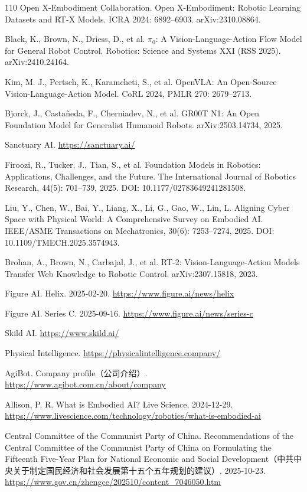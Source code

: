 \documentclass[10pt]{article}
\begin{document}
\begin{thebibliography}{110}
Open X-Embodiment Collaboration. Open X-Embodiment: Robotic Learning Datasets and RT-X Models. ICRA 2024: 6892–6903. arXiv:2310.08864.

Black, K., Brown, N., Driess, D., et al. $\pi_0$: A Vision-Language-Action Flow Model for General Robot Control. Robotics: Science and Systems XXI (RSS 2025). arXiv:2410.24164.

Kim, M. J., Pertsch, K., Karamcheti, S., et al. OpenVLA: An Open-Source Vision-Language-Action Model. CoRL 2024, PMLR 270: 2679–2713.

Bjorck, J., Castañeda, F., Cherniadev, N., et al. GR00T N1: An Open Foundation Model for Generalist Humanoid Robots. arXiv:2503.14734, 2025.

Sanctuary AI. \url{https://sanctuary.ai/}

Firoozi, R., Tucker, J., Tian, S., et al. Foundation Models in Robotics: Applications, Challenges, and the Future. The International Journal of Robotics Research, 44(5): 701–739, 2025. DOI: 10.1177/02783649241281508.

Liu, Y., Chen, W., Bai, Y., Liang, X., Li, G., Gao, W., Lin, L. Aligning Cyber Space with Physical World: A Comprehensive Survey on Embodied AI. IEEE/ASME Transactions on Mechatronics, 30(6): 7253–7274, 2025. DOI: 10.1109/TMECH.2025.3574943.

Brohan, A., Brown, N., Carbajal, J., et al. RT-2: Vision-Language-Action Models Transfer Web Knowledge to Robotic Control. arXiv:2307.15818, 2023.

Figure AI. Helix. 2025-02-20. \url{https://www.figure.ai/news/helix}

Figure AI. Series C. 2025-09-16. \url{https://www.figure.ai/news/series-c}

Skild AI. \url{https://www.skild.ai/}

Physical Intelligence. \url{https://physicalintelligence.company/}

AgiBot. Company profile（公司介绍）. \url{https://www.agibot.com.cn/about/company}

Allison, P. R. What is Embodied AI? Live Science, 2024-12-29. \url{https://www.livescience.com/technology/robotics/what-is-embodied-ai}

Central Committee of the Communist Party of China. Recommendations of the Central Committee of the Communist Party of China on Formulating the Fifteenth Five-Year Plan for National Economic and Social Development（中共中央关于制定国民经济和社会发展第十五个五年规划的建议）. 2025-10-23. \url{https://www.gov.cn/zhengce/202510/content_7046050.htm}


\end{thebibliography}
\end{document}
